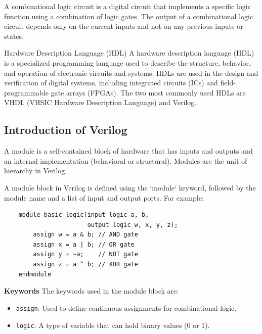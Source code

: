\documentclass[11pt]{report}
\begin{document}
\begin{definition}
    A combinational logic circuit is a digital circuit that implements a specific logic function using a combination of logic gates. The output of a combinational logic circuit depends only on the current inputs and not on any previous inputs or states. 
\end{definition}
\begin{definition}{Hardware Description Language (HDL)}
    A hardware description language (HDL) is a specialized programming language used to describe the structure, behavior, and operation of electronic circuits and systems. HDLs are used in the design and verification of digital systems, including integrated circuits (ICs) and field-programmable gate arrays (FPGAs). The two most commonly used HDLs are VHDL (VHSIC Hardware Description Language) and Verilog.
\end{definition}
\subsection{Introduction of Verilog}


\begin{definition}[Module]
    A module is a self-contained block of hardware that has inputs and outputs and an internal implementation (behavioral or structural). Modules are the unit of hierarchy in Verilog.
\end{definition}

\begin{example}
    A module block in Verilog is defined using the `module` keyword, followed by the module name and a list of input and output ports. For example:
    \begin{verbatim}
    module basic_logic(input logic a, b,
                       output logic w, x, y, z);
        assign w = a & b; // AND gate
        assign x = a | b; // OR gate
        assign y = ~a;    // NOT gate
        assign z = a ^ b; // XOR gate
    endmodule
    \end{verbatim}

    \textbf{Keywords} The keywords used in the module block are:
    \begin{itemize}
        \item \verb|assign|: Used to define continuous assignments for combinational logic.
        \item \verb|logic|: A type of variable that can hold binary values (0 or 1).
    \end{itemize}
\end{example}
\end{document}
